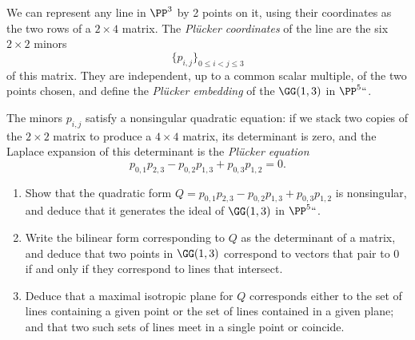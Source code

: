 \begin{exercise}
\label{G13}
We can represent any line in $\PP^3$ by 2 points on it, 
using their
coordinates as the two rows of a
$2\times 4$ matrix. The \emph{Pl\"ucker coordinates} of the line are
%
the six $2\times 2$ minors
$$
\{p_{i,j}\}_{0\leq i<j\leq 3}
$$
of this matrix. They are independent, up to a common scalar multiple,
of the two points chosen, and define the \emph{Pl\"ucker embedding}
%
of the 
%
$\GG(1,3)$ in $\PP^5` `$.

The minors $p_{i,j}$  satisfy a nonsingular quadratic equation: if we
stack two copies of the $2\times 2$
matrix to produce a $4\times 4$ matrix, its determinant is zero, and
the Laplace expansion of this determinant
is the \emph{Pl\"ucker equation}
%
$$
p_{0,1}p_{2,3}-p_{0,2}p_{1,3}+p_{0,3}p_{1,2} = 0.
$$

\begin{enumerate}
\item Show that the quadratic form
$
Q = p_{0,1}p_{2,3}-p_{0,2}p_{1,3}+p_{0,3}p_{1,2}
$
is non\-singular, and deduce that it generates the ideal of $\GG(1,3)$
in $\PP^5` `$.
\item
Write the bilinear form corresponding to $Q$ as the determinant of a
matrix, and deduce that
two points in $\GG(1,3)$ correspond to vectors that pair to 0 if and
only if they correspond to lines that intersect.
\item Deduce that a maximal isotropic plane for $Q$ corresponds either to
the set of lines containing a given point or the set of lines contained
in a given plane; and that two such sets of lines 
%
meet in a single point or coincide.
\end{enumerate}
\end{exercise}


